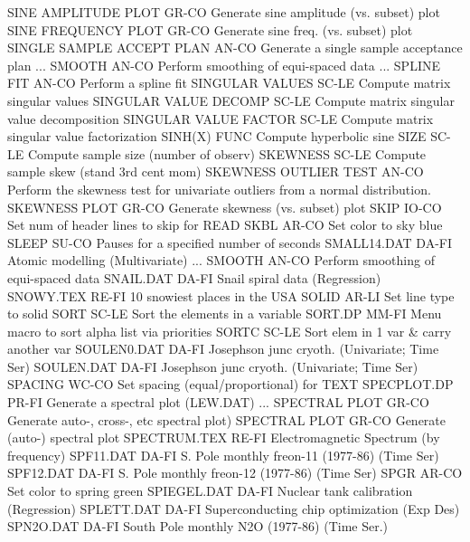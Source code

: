 SINE AMPLITUDE PLOT         GR-CO Generate sine amplitude (vs. subset) plot
SINE FREQUENCY PLOT         GR-CO Generate sine freq. (vs. subset) plot
SINGLE SAMPLE ACCEPT PLAN   AN-CO Generate a single sample acceptance plan
... SMOOTH                  AN-CO Perform smoothing of equi-spaced data
... SPLINE FIT              AN-CO Perform a spline fit
SINGULAR VALUES             SC-LE Compute matrix singular values
SINGULAR VALUE DECOMP       SC-LE Compute matrix singular value decomposition
SINGULAR VALUE FACTOR       SC-LE Compute matrix singular value factorization
SINH(X)                     FUNC  Compute hyperbolic sine
SIZE                        SC-LE Compute sample size (number of observ)
SKEWNESS                    SC-LE Compute sample skew (stand 3rd cent mom)
SKEWNESS OUTLIER TEST       AN-CO Perform the skewness test for univariate outliers from a normal distribution.
SKEWNESS PLOT               GR-CO Generate skewness (vs. subset) plot
SKIP                        IO-CO Set num of header lines to skip for READ
SKBL                        AR-CO Set color to sky blue
SLEEP                       SU-CO Pauses for a specified number of seconds
SMALL14.DAT                 DA-FI Atomic modelling (Multivariate)
... SMOOTH                  AN-CO Perform smoothing of equi-spaced data
SNAIL.DAT                   DA-FI Snail spiral data (Regression)
SNOWY.TEX                   RE-FI 10 snowiest places in the USA
SOLID                       AR-LI Set line type to solid
SORT                        SC-LE Sort the elements in a variable
SORT.DP                     MM-FI Menu macro to sort alpha list via priorities
SORTC                       SC-LE Sort elem in 1 var & carry another var
SOULEN0.DAT                 DA-FI Josephson junc cryoth. (Univariate; Time Ser)
SOULEN.DAT                  DA-FI Josephson junc cryoth. (Univariate; Time Ser)
SPACING                     WC-CO Set spacing (equal/proportional) for TEXT
SPECPLOT.DP                 PR-FI Generate a spectral plot (LEW.DAT)
... SPECTRAL PLOT           GR-CO Generate auto-, cross-, etc spectral plot)
SPECTRAL PLOT               GR-CO Generate (auto-) spectral plot
SPECTRUM.TEX                RE-FI Electromagnetic Spectrum (by frequency)
SPF11.DAT                   DA-FI S. Pole monthly freon-11 (1977-86) (Time Ser)
SPF12.DAT                   DA-FI S. Pole monthly freon-12 (1977-86) (Time Ser)
SPGR                        AR-CO Set color to spring green
SPIEGEL.DAT                 DA-FI Nuclear tank calibration (Regression)
SPLETT.DAT                  DA-FI Superconducting chip optimization (Exp Des)
SPN2O.DAT                   DA-FI South Pole monthly N2O (1977-86) (Time Ser.)
